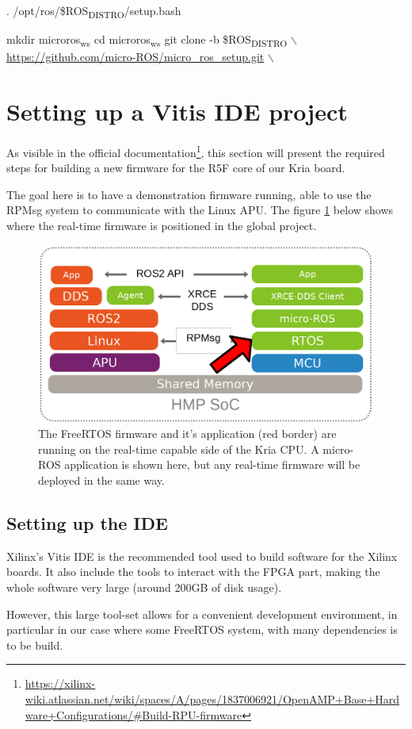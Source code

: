 \documentclass[10pt]{article}
\begin{document}
. /opt/ros/\$ROS\textsubscript{DISTRO}/setup.bash

mkdir microros\textsubscript{ws}
cd microros\textsubscript{ws}
git clone -b \$ROS\textsubscript{DISTRO} $\backslash$
    \url{https://github.com/micro-ROS/micro\_ros\_setup.git} $\backslash$
\clearpage
\section{Setting up a Vitis IDE project}
\label{sec:org4401fb8}
As visible in the official documentation\footnote{\url{https://xilinx-wiki.atlassian.net/wiki/spaces/A/pages/1837006921/OpenAMP+Base+Hardware+Configurations/\#Build-RPU-firmware}}, this section will present the required
steps for building a new firmware for the R5F core of our Kria board.

The goal here is to have a demonstration firmware running,
able to use the RPMsg system to communicate with the Linux APU.
The figure \ref{fig:org18e6f0f} below shows where the real-time firmware
is positioned in the global project.

\begin{figure}[htbp]
\centering
\includegraphics[width=.6\textwidth]{./img/map_microros.png}
\caption{\label{fig:org18e6f0f}The FreeRTOS firmware and it's application (red border) are running on the real-time capable side of the Kria CPU. A micro-ROS application is shown here, but any real-time firmware will be deployed in the same way.}
\end{figure}

\subsection{Setting up the IDE}
\label{sec:org08057db}
Xilinx's Vitis IDE is the recommended tool used to build software for the Xilinx boards.
It also include the tools to interact with the FPGA part, making the whole
software very large (around 200GB of disk usage).

However, this large tool-set allows for a convenient development environment, in particular
in our case where some FreeRTOS system, with many dependencies is to be build.
\end{document}
